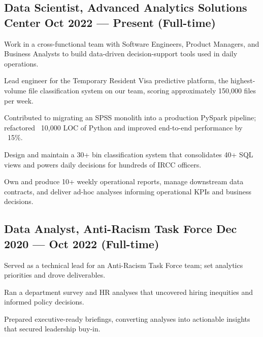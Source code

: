 \subsection{{Data Scientist, Advanced Analytics Solutions Center \hfill Oct 2022 --- Present (Full-time)}}
\begin{zitemize}
    \setlength\itemsep{0.4em}
    \item Work in a cross-functional team with Software Engineers, Product Managers, and Business Analysts to build data-driven decision-support tools used in daily operations.
    \item Lead engineer for the Temporary Resident Visa predictive platform, the highest-volume file classification system on our team, scoring approximately 150{,}000 files per week.
    \item Contributed to migrating an SPSS monolith into a production PySpark pipeline; refactored ~10{,}000 LOC of Python and improved end-to-end performance by ~15\%.
    \item Design and maintain a 30+ bin classification system that consolidates 40+ SQL views and powers daily decisions for hundreds of IRCC officers.
    \item Own and produce 10+ weekly operational reports, manage downstream data contracts, and deliver ad-hoc analyses informing operational KPIs and business decisions.
\end{zitemize}
\vspace{0.75em}

\subsection{{Data Analyst, Anti-Racism Task Force \hfill Dec 2020 --- Oct 2022 (Full-time)}}
\begin{zitemize}
    \setlength\itemsep{0.4em}
    \item Served as a technical lead for an Anti-Racism Task Force team; set analytics priorities and drove deliverables.
    \item Ran a department survey and HR analyses that uncovered hiring inequities and informed policy decisions.
    \item Prepared executive-ready briefings, converting analyses into actionable insights that secured leadership buy-in.
\end{zitemize}
\vspace{0.75em}

